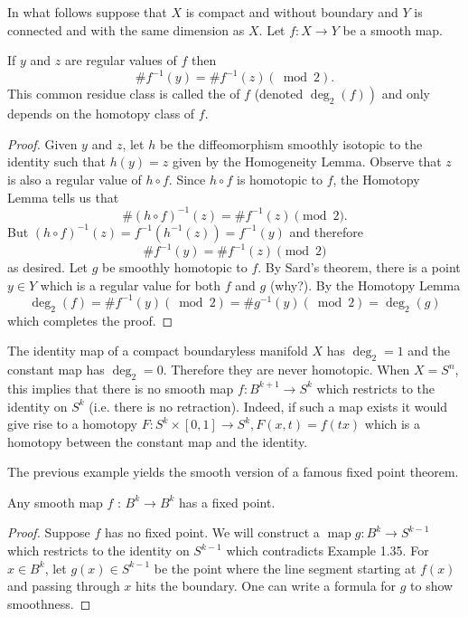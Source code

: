 \documentclass[a4paper, 10pt, twocolumn]{amsart}
\begin{document}
In what follows suppose that $X$ is compact and without boundary and $Y$ is connected and with the same dimension as $X$. Let $f: X \rightarrow Y$ be a smooth map.

\begin{theorem}
    If $y$ and $z$ are regular values of $f$ then
    $$
    \# f^{-1}(y)=\# f^{-1}(z)(\bmod 2).
    $$
    This common residue class is called the  of $f$ (denoted $\left.\operatorname{deg}_{2}(f)\right)$ and only depends on the homotopy class of $f$.
\end{theorem}
\begin{proof}
    Given $y$ and $z$, let $h$ be the diffeomorphism smoothly isotopic to the identity such that $h(y)=z$ given by the Homogeneity Lemma. Observe that $z$ is also a regular value of $h \circ f$. Since $h \circ f$ is homotopic to $f$, the Homotopy Lemma tells us that
$$
\#(h \circ f)^{-1}(z)=\# f^{-1}(z) \pmod 2.
$$
But $(h \circ f)^{-1}(z)=f^{-1}\left(h^{-1}(z)\right)=f^{-1}(y)$ and therefore
$$
\# f^{-1}(y)=\# f^{-1}(z) \pmod 2
$$
as desired. Let $g$ be smoothly homotopic to $f$. By Sard's theorem, there is a point $y \in Y$ which is a regular value for both $f$ and $g$ (why?). By the Homotopy Lemma
$$
\operatorname{deg}_{2}(f)=\# f^{-1}(y)(\bmod 2)=\# g^{-1}(y)(\bmod 2)=\operatorname{deg}_{2}(g)
$$
which completes the proof. 
\end{proof}

\begin{example}
    The identity map of a compact boundaryless manifold $X$ has $\operatorname{deg}_{2}=1$ and the constant map has $\operatorname{deg}_{2}=0$. Therefore they are never homotopic. When $X=S^{n}$, this implies that there is no smooth map $f: B^{k+1} \rightarrow S^{k}$ which restricts to the identity on $S^{k}$ (i.e. there is no retraction). Indeed, if such a map exists it would give rise to a homotopy $F: S^{k} \times[0,1] \rightarrow S^{k}, F(x, t)=f(t x)$ which is a homotopy between the constant map and the identity.
\end{example}

The previous example yields the smooth version of a famous fixed point theorem.

\begin{theorem}
    Any smooth map $f$ : $B^{k} \rightarrow B^{k}$ has a fixed point.
\end{theorem}
\begin{proof}
    Suppose $f$ has no fixed point. We will construct a $\operatorname{map} g: B^{k} \rightarrow S^{k-1}$ which restricts to the identity on $S^{k-1}$ which contradicts Example 1.35. For $x \in B^{k}$, let $g(x) \in S^{k-1}$ be the point where the line segment starting at $f(x)$ and passing through $x$ hits the boundary. One can write a formula for $g$ to show smoothness.
\end{proof}
\end{document}
